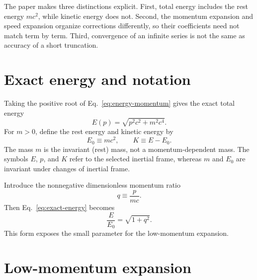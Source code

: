 \documentclass[12pt]{article}
\begin{document}
The paper makes three distinctions explicit. First, total energy includes the rest energy $mc^2$, while kinetic energy does not. Second, the momentum expansion and speed expansion organize corrections differently, so their coefficients need not match term by term. Third, convergence of an infinite series is not the same as accuracy of a short truncation.

\section{Exact energy and notation}

Taking the positive root of Eq.~\eqref{eq:energy-momentum} gives the exact total energy
\begin{equation}
  E(p)=\sqrt{p^2c^2+m^2c^4}.
  \label{eq:exact-energy}
\end{equation}
For $m>0$, define the rest energy and kinetic energy by
\begin{equation}
  E_0\equiv mc^2,
  \qquad
  K\equiv E-E_0.
  \label{eq:kinetic-definitions}
\end{equation}
The mass $m$ is the invariant (rest) mass, not a momentum-dependent mass. The symbols $E$, $p$, and $K$ refer to the selected inertial frame, whereas $m$ and $E_0$ are invariant under changes of inertial frame.

Introduce the nonnegative dimensionless momentum ratio
\begin{equation}
  q\equiv\frac{p}{mc}.
  \label{eq:q-definition}
\end{equation}
Then Eq.~\eqref{eq:exact-energy} becomes
\begin{equation}
  \frac{E}{E_0}=\sqrt{1+q^2}.
  \label{eq:dimensionless-energy}
\end{equation}
This form exposes the small parameter for the low-momentum expansion.

\section{Low-momentum expansion}
\end{document}
